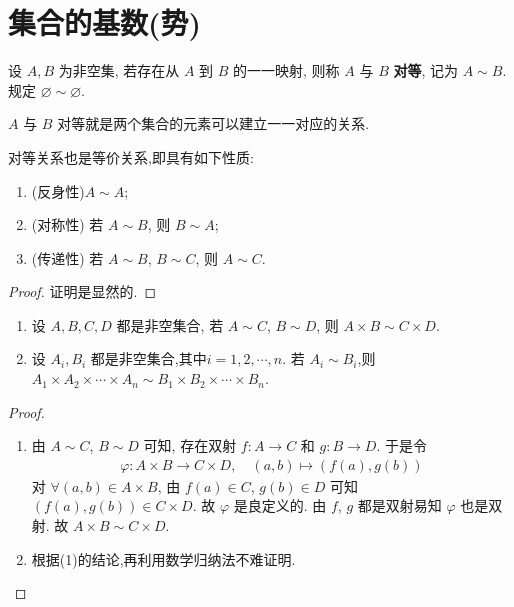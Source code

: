 \documentclass[../../main.tex]{subfiles}%
\begin{document}
\section{集合的基数(势)}

\begin{definition}[集合的对等]
设 $A, B$ 为非空集, 若存在从 $A$ 到 $B$ 的一一映射, 则称 $A$ 与 $B$ \textbf{对等}, 记为 $A \sim B$. 规定 $\varnothing \sim \varnothing$.
\end{definition}
\begin{note}
$A$ 与 $B$ 对等就是两个集合的元素可以建立一一对应的关系. 
\end{note}

\begin{theorem}\label{theorem:对等关系也是等价关系}
对等关系也是等价关系,即具有如下性质:
\begin{enumerate}[(1)]
\item (反身性)$A \sim A$;
\item (对称性) 若 $A \sim B$, 则 $B \sim A$;
\item (传递性) 若 $A \sim B$, $B \sim C$, 则 $A \sim C$.
\end{enumerate} 
\end{theorem}
\begin{proof}

证明是显然的.

\end{proof}

\begin{proposition}\label{proposition:对等集合的积也对等}
\begin{enumerate}[(1)]
\item 设 $A, B, C, D$ 都是非空集合, 若 $A \sim C$, $B \sim D$, 则 $A \times B \sim C \times D$.

\item 设 $A_i, B_i$ 都是非空集合,其中$i=1,2,\cdots,n$. 若 $A_i \sim B_i$,则 $A_1\times A_2\times \cdots \times A_n\sim B_1\times B_2\times \cdots \times B_n$.
\end{enumerate}
\end{proposition}
\begin{proof}
\begin{enumerate}[(1)]
\item 由 $A \sim C$, $B \sim D$ 可知, 存在双射 $f : A \rightarrow C$ 和 $g : B \rightarrow D$. 于是令
\begin{align*}
\varphi : A \times B \rightarrow C \times D, \quad (a, b) \mapsto (f(a), g(b))
\end{align*}
对 $\forall (a, b) \in A \times B$, 由 $f(a) \in C$, $g(b) \in D$ 可知 $(f(a), g(b)) \in C \times D$. 故 $\varphi$ 是良定义的. 由 $f$, $g$ 都是双射易知 $\varphi$ 也是双射. 故 $A \times B \sim C \times D$. 


\item 根据(1)的结论,再利用数学归纳法不难证明.
\end{enumerate}

\end{proof}
\end{document}
